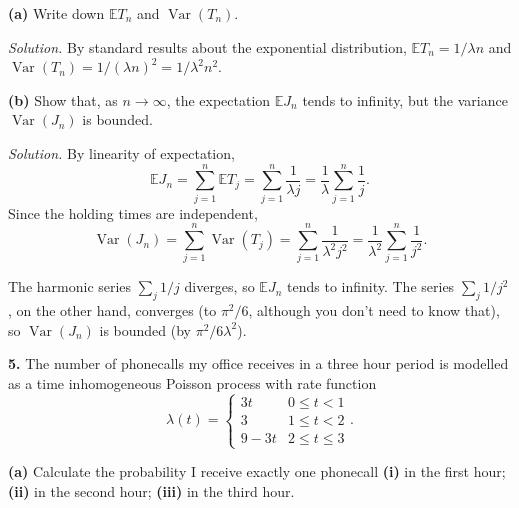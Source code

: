 \documentclass[
  a4paper,
]{article}
\theoremstyle{definition}
\theoremstyle{definition}
\theoremstyle{definition}
\theoremstyle{remark}
\begin{document}
\textbf{(a)} Write down \(\mathbb E T_n\) and \(\operatorname{Var}(T_n)\).

\begin{myanswers}
\emph{Solution.} By standard results about the exponential distribution, \(\mathbb E T_n = 1/\lambda n\) and \(\operatorname{Var}(T_n) = 1/(\lambda n)^2 = 1/\lambda^2 n^2\).

\end{myanswers}

\textbf{(b)} Show that, as \(n \to \infty\), the expectation \(\mathbb E J_n\) tends to infinity, but the variance \(\operatorname{Var}(J_n)\) is bounded.

\begin{myanswers}
\emph{Solution.} By linearity of expectation,
\[ \mathbb E J_n = \sum_{j=1}^n \mathbb E T_j = \sum_{j=1}^n \frac{1}{\lambda j} = \frac{1}{\lambda} \sum_{j=1}^n \frac{1}j . \]
Since the holding times are independent,
\[ \operatorname{Var}(J_n) = \sum_{j=1}^n \operatorname{Var}(T_j) = \sum_{j=1}^n \frac{1}{\lambda^2 j^2} = \frac{1}{\lambda^2} \sum_{j=1}^n \frac{1}{j^2} . \]

The harmonic series \(\sum_j 1/j\) diverges, so \(\mathbb E J_n\) tends to infinity. The series \(\sum_j 1/j^2\), on the other hand, converges (to \(\pi^2/6\), although you don't need to know that), so \(\operatorname{Var}(J_n)\) is bounded (by \(\pi^2/6\lambda^2\)).

\end{myanswers}

\textbf{5.} The number of phonecalls my office receives in a three hour period is modelled as a time inhomogeneous Poisson process with rate function
\[ \lambda(t) = \begin{cases} 3t & 0 \leq t < 1 \\
3  & 1 \leq t < 2 \\
9 - 3t & 2 \leq t \leq 3 \end{cases}. \]

\textbf{(a)} Calculate the probability I receive exactly one phonecall \textbf{(i)} in the first hour; \textbf{(ii)} in the second hour; \textbf{(iii)} in the third hour.
\end{document}

